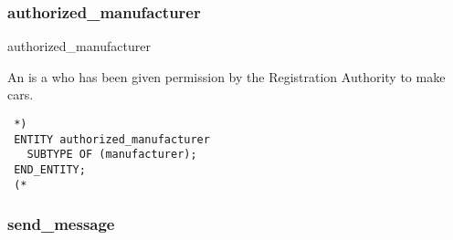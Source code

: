 \documentclass{article}
\begin{document}
 \subsubsection{authorized\_manufacturer}

 \begin{Mnamedesc}{authorized_manufacturer}

 \begin{Mdesctext}

 An  is a  who has been given
 permission by the Registration Authority to make cars.

 \end{Mdesctext}

 \begin{Mexp}
 \begin{verbatim}
 *)
 ENTITY authorized_manufacturer
   SUBTYPE OF (manufacturer);
 END_ENTITY;
 (*
 \end{verbatim}
 \end{Mexp}
 \end{Mnamedesc}


 \subsubsection{send\_message}
\end{document}
